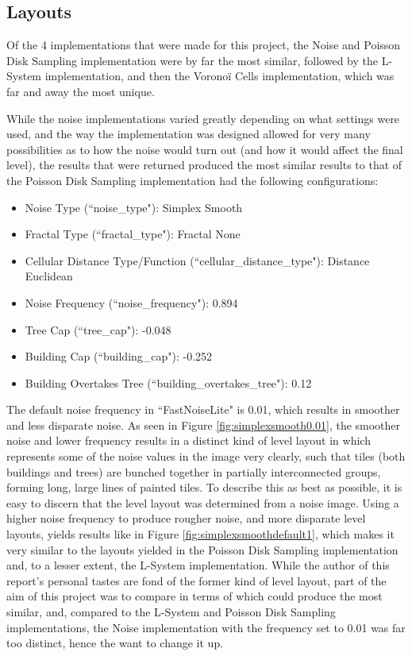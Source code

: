 \subsection{Layouts}

Of the 4 implementations that were made for this project, the Noise and Poisson Disk Sampling implementation were by far the most similar, followed by the L-System implementation, and then the Voronoï Cells implementation, which was far and away the most unique.

While the noise implementations varied greatly depending on what settings were used, and the way the implementation was designed allowed for very many possibilities as to how the noise would turn out (and how it would affect the final level), the results that were returned produced the most similar results to that of the Poisson Disk Sampling implementation had the following configurations:

\begin{itemize} \label{noisedefaults}
    \item Noise Type (``noise\_type"): Simplex Smooth
    \item Fractal Type (``fractal\_type"): Fractal None
    \item Cellular Distance Type/Function (``cellular\_distance\_type"): Distance Euclidean
    \item Noise Frequency (``noise\_frequency"): 0.894
    \item Tree Cap (``tree\_cap"): -0.048
    \item Building Cap (``building\_cap"): -0.252
    \item Building Overtakes Tree (``building\_overtakes\_tree"): 0.12
\end{itemize}

The default noise frequency in ``FastNoiseLite" is 0.01, which results in smoother and less disparate noise. As seen in Figure \ref{fig:simplexsmooth0.01}, the smoother noise and lower frequency results in a distinct kind of level layout in which represents some of the noise values in the image very clearly, such that tiles (both buildings and trees) are bunched together in partially interconnected groups, forming long, large lines of painted tiles. To describe this as best as possible, it is easy to discern that the level layout was determined from a noise image. Using a higher noise frequency to produce rougher noise, and more disparate level layouts, yields results like in Figure \ref{fig:simplexsmoothdefault1}, which makes it very similar to the layouts yielded in the Poisson Disk Sampling implementation and, to a lesser extent, the L-System implementation. While the author of this report's personal tastes are fond of the former kind of level layout, part of the aim of this project was to compare in terms of which could produce the most similar, and, compared to the L-System and Poisson Disk Sampling implementations, the Noise implementation with the frequency set to 0.01 was far too distinct, hence the want to change it up.

